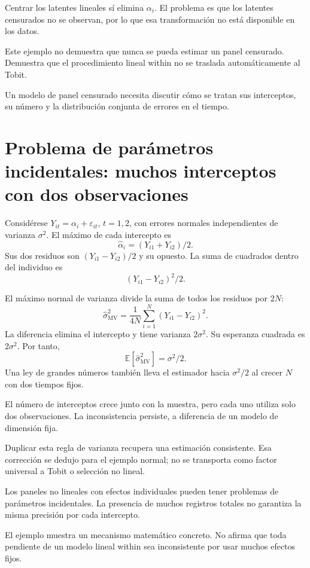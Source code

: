 \documentclass[11pt,a4paper]{article}
\newcommand{\E}{\mathbb E}
\begin{document}
\begin{ejemplo}
Centrar los latentes lineales sí
elimina \(\alpha_i\).
El problema es que
los latentes censurados no
se observan, por lo que
esa transformación no está
disponible en los datos.
\end{ejemplo}
Este ejemplo no demuestra
que nunca se pueda
estimar un panel censurado.
Demuestra que el procedimiento
lineal within no se
traslada automáticamente al Tobit.

Un modelo de panel
censurado necesita discutir
cómo se tratan sus
interceptos, su número
y la distribución conjunta
de errores en el tiempo.

\clearpage
\section{Problema de parámetros incidentales: muchos interceptos con dos observaciones}\label{unidad171}
Considérese
\(Y_{it}=\alpha_i+\varepsilon_{it}\),
\(t=1,2\), con errores
normales independientes de
varianza \(\sigma^2\).
El máximo de cada intercepto es
\[
\widehat\alpha_i=(Y_{i1}+Y_{i2})/2.
\]
Sus dos residuos son
\((Y_{i1}-Y_{i2})/2\)
y su opuesto.
La suma de cuadrados
dentro del individuo es
\[
(Y_{i1}-Y_{i2})^2/2.
\]

El máximo normal de
varianza divide la suma
de todos los residuos
por \(2N\):
\[
\widehat\sigma^2_{\mathrm{MV}}
=\frac1{4N}\sum_{i=1}^N(Y_{i1}-Y_{i2})^2.
\]
La diferencia elimina
el intercepto y tiene
varianza \(2\sigma^2\).
Su esperanza cuadrada es
\(2\sigma^2\).
Por tanto,
\[
\E[\widehat\sigma^2_{\mathrm{MV}}]
=\sigma^2/2.
\]
Una ley de grandes números
también lleva el estimador
hacia \(\sigma^2/2\)
al crecer \(N\) con
dos tiempos fijos.

El número de interceptos
crece junto con la muestra,
pero cada uno utiliza
solo dos observaciones.
La inconsistencia persiste,
a diferencia de un
modelo de dimensión fija.

\begin{ejemplo}
Duplicar esta regla de
varianza recupera una
estimación consistente.
Esa corrección se dedujo
para el ejemplo normal;
no se transporta como
factor universal a Tobit
o selección no lineal.
\end{ejemplo}
Los paneles no lineales
con efectos individuales
pueden tener problemas
de parámetros incidentales.
La presencia de muchos
registros totales no
garantiza la misma precisión
por cada intercepto.

El ejemplo muestra un
mecanismo matemático concreto.
No afirma que toda
pendiente de un modelo
lineal within sea
inconsistente por usar
muchos efectos fijos.
\end{document}
